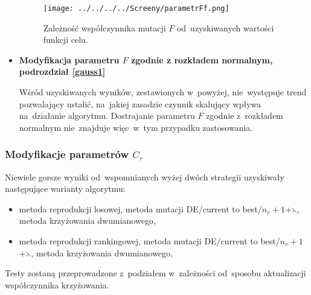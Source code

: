 \begin{itemize}
\begin{figure}[h!]
\begin{center}
		\texttt{[image: ../../../../Screeny/parametrFf.png]}
		\caption{Zależność współczynnika mutacji $F$ od~uzyskiwanych wartości funkcji celu.}
		\label{wykresF}	
\end{center}		
\end{figure}
\par
\item \textbf{Modyfikacja parametru $F$ zgodnie z rozkładem normalnym, podrozdział \ref{gauss1}}

Wśród uzyskiwanych wyników, zestawionych w~powyżej, nie~występuje trend pozwalający ustalić, na~jakiej zasadzie czynnik skalujący wpływa na~działanie algorytmu. Dostrajanie parametru $F$ zgodnie z~rozkładem normalnym nie~znajduje więc~w~tym przypadku zastosowania.

\end{itemize}

\subsubsection{Modyfikacje parametrów $C_{r}$}

Niewiele gorsze wyniki od~wspomnianych wyżej dwóch strategii uzyskiwały następujące warianty algorytmu:\\
\begin{itemize}
\item metoda reprodukcji losowej, metoda mutacji  DE/current to best/$n_{v}+1$+$\leftthreetimes$, metoda krzyżowania dwumianowego,\\
\item metoda reprodukcji rankingowej, metoda mutacji  DE/current to best/$n_{v}+1$+$\leftthreetimes$, metoda krzyżowania dwumianowego,\\
\end{itemize}
Testy zostaną przeprowadzone z~podziałem w~zależności od~sposobu aktualizacji współczynnika krzyżowania.

